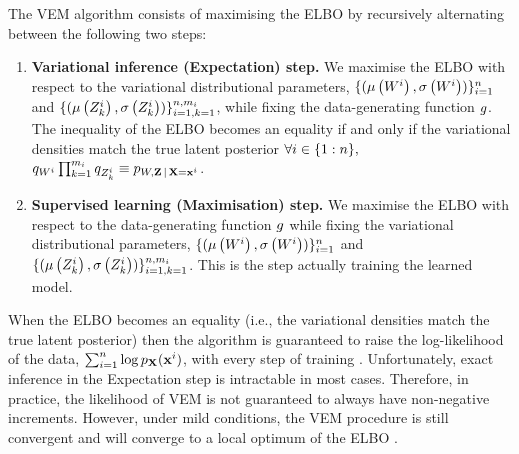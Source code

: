 \documentclass[../thesis.tex]{subfiles}
\begin{document}
The VEM algorithm consists of maximising the ELBO by recursively alternating between the following two steps:

\begin{enumerate}
    \item \textbf{Variational inference (Expectation) step.} We maximise the ELBO with respect to the variational distributional parameters, $\{(\myvect{\mu} \left( {\myrv{w}}^i \right), \myvect{\sigma} \left( {\myrv{w}}^i \right))\}_{i=1}^\mycnt{n}$ and $\{(\myvect{\mu} \left( {\myrv{z}}^i_k \right), \myvect{\sigma} \left( {\myrv{z}}^i_k \right))\}_{i=1, k=1}^{\mycnt{n}, \mycnt{m}_i}$, while fixing the data-generating function $g$. The inequality of the ELBO becomes an equality if and only if the variational densities match the true latent posterior $\forall i \in \{1:n\},$ $\myfunc{q}_{\myrv{w}^i} \prod_{k=1}^{\mycnt{m}_i} \myfunc{q}_{\myrv{z}^i_k} \equiv \myfunc{p}_{\myrv{w}, \mygroup{\myrv{z}} \,|\, \mygroup{\myrv{x}} = \mygroup{\myvect{x}}^i}$. 
    \item \textbf{Supervised learning (Maximisation) step.} We maximise the ELBO with respect to the data-generating function $g$ while fixing the variational distributional parameters, $\{(\myvect{\mu} \left( {\myrv{w}}^i \right), \myvect{\sigma} \left( {\myrv{w}}^i \right))\}_{i=1}^\mycnt{n}$ and $\{(\myvect{\mu} \left( {\myrv{z}}^i_k \right), \myvect{\sigma} \left( {\myrv{z}}^i_k \right))\}_{i=1, k=1}^{\mycnt{n}, \mycnt{m}_i}$. This is the step actually training the learned model.
\end{enumerate}

When the ELBO becomes an equality (i.e., the variational densities match the true latent posterior) then the algorithm is guaranteed to raise the log-likelihood of the data, $\sum_{i=1}^\mycnt{n} \log \myfunc{p}_{\mygroup{\myrv{x}}} (\mygroup{\myvect{x}}^i)$, with every step of training \citep{bleiVariationalInferenceReview2017}. Unfortunately, exact inference in the Expectation step is intractable in most cases. Therefore, in practice, the likelihood of VEM is not guaranteed to always have non-negative increments. However, under mild conditions, the VEM procedure is still convergent and will converge to a local optimum of the ELBO \citep{bleiVariationalInferenceReview2017}. 
\end{document}
